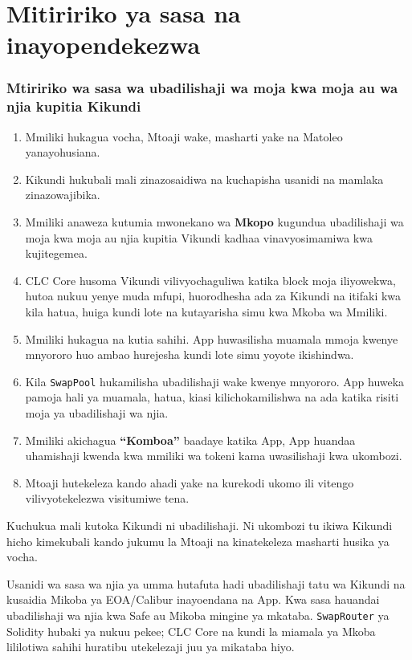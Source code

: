 \documentclass[11pt]{article}
\begin{document}
\section*{Mitiririko ya sasa na inayopendekezwa}

\subsubsection*{Mtiririko wa sasa wa ubadilishaji wa moja kwa moja au wa njia kupitia Kikundi}

\begin{enumerate}[leftmargin=*]
\item Mmiliki hukagua vocha, Mtoaji wake, masharti yake na Matoleo yanayohusiana.
\item Kikundi hukubali mali zinazosaidiwa na kuchapisha usanidi na mamlaka zinazowajibika.
\item Mmiliki anaweza kutumia mwonekano wa \textbf{Mkopo} kugundua ubadilishaji wa moja kwa moja au njia kupitia Vikundi kadhaa vinavyosimamiwa kwa kujitegemea.
\item CLC Core husoma Vikundi vilivyochaguliwa katika block moja iliyowekwa, hutoa nukuu yenye muda mfupi, huorodhesha ada za Kikundi na itifaki kwa kila hatua, huiga kundi lote na kutayarisha simu kwa Mkoba wa Mmiliki.
\item Mmiliki hukagua na kutia sahihi. App huwasilisha muamala mmoja kwenye mnyororo huo ambao hurejesha kundi lote simu yoyote ikishindwa.
\item Kila \texttt{SwapPool} hukamilisha ubadilishaji wake kwenye mnyororo. App huweka pamoja hali ya muamala, hatua, kiasi kilichokamilishwa na ada katika risiti moja ya ubadilishaji wa njia.
\item Mmiliki akichagua \textbf{``Komboa''} baadaye katika App, App huandaa uhamishaji kwenda kwa mmiliki wa tokeni kama uwasilishaji kwa ukombozi.
\item Mtoaji hutekeleza kando ahadi yake na kurekodi ukomo ili vitengo vilivyotekelezwa visitumiwe tena.
\end{enumerate}
Kuchukua mali kutoka Kikundi ni ubadilishaji. Ni ukombozi tu ikiwa Kikundi hicho kimekubali kando jukumu la Mtoaji na kinatekeleza masharti husika ya vocha.

Usanidi wa sasa wa njia ya umma hutafuta hadi ubadilishaji tatu wa Kikundi na kusaidia Mikoba ya EOA/Calibur inayoendana na App. Kwa sasa hauandai ubadilishaji wa njia kwa Safe au Mikoba mingine ya mkataba. \texttt{SwapRouter} ya Solidity hubaki ya nukuu pekee; CLC Core na kundi la miamala ya Mkoba lililotiwa sahihi huratibu utekelezaji juu ya mikataba hiyo.
\end{document}
